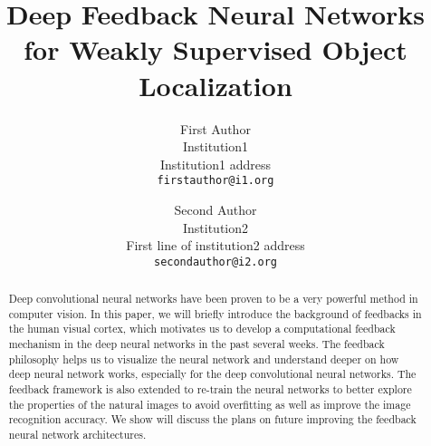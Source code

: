 \documentclass[10pt,twocolumn,letterpaper]{article}
\begin{document}
\title{Deep Feedback Neural Networks for Weakly Supervised Object Localization}

\author{First Author\\
Institution1\\
Institution1 address\\
{\tt\small firstauthor@i1.org}
\and
Second Author\\
Institution2\\
First line of institution2 address\\
{\tt\small secondauthor@i2.org}
}

\maketitle


\begin{abstract}
Deep convolutional neural networks have been proven to be a very powerful method in computer vision. In this paper, we will briefly introduce the background of feedbacks in the human visual cortex, which motivates us to develop a computational feedback mechanism in the deep neural networks in the past several weeks. The feedback philosophy helps us to visualize the neural network and understand deeper on how deep neural network works, especially for the deep convolutional neural networks. The feedback framework is also extended to re-train the neural networks to better explore the properties of the natural images to avoid overfitting as well as improve the image recognition accuracy. We show will discuss the plans on future improving the feedback neural network architectures.
\end{abstract}







{\small


}
\end{document}
